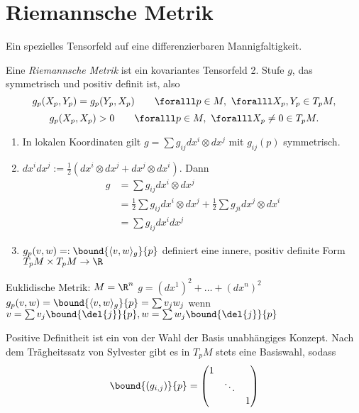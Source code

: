 \chapter{Riemannsche Metrik}

Ein spezielles Tensorfeld auf eine differenzierbaren Mannigfaltigkeit.

\begin{defn*}
	Eine \emph{Riemannsche Metrik} ist ein kovariantes Tensorfeld 2. Stufe $g$, das symmetrisch und positiv definit ist, also
	\[ g_p(X_p,Y_p) = g_p(Y_p,X_p) \qquad \foralll p \in M,\ \foralll X_p,Y_p \in T_pM, \]
	\[ g_p(X_p,X_p) > 0 \qquad \foralll p \in M,\ \foralll X_p \neq 0 \in T_pM. \]
\end{defn*}

\begin{rem*}
	\begin{enumerate}[label= {\roman*})]
		\item In lokalen Koordinaten gilt $ g = \sum g_{ij} dx^i \otimes dx^j $ mit $g_{ij}(p)$ symmetrisch.
		\item $ dx^idx^j := \frac{1}{2}(dx^i \otimes dx^j + dx^j \otimes dx^i) $. Dann
			\begin{align*}
				g &= \sum g_{ij} dx^i \otimes dx^j\\
				&= \frac{1}{2} \sum g_{ij} dx^i \otimes dx^j + \frac{1}{2} \sum g_{ji} dx^j \otimes dx^i\\
				&= \sum g_{ij} dx^idx^j
			\end{align*}
		\item $ g_p(v,w) =: \bound{\langle v,w\rangle_g}{p} $ definiert eine innere, positiv definite Form $ T_pM \times T_pM \to \R $
	\end{enumerate}
\end{rem*}

\begin{exmp*}
	Euklidische Metrik: $M = \R^n$
	$ g = (dx^1)^2 + \dots + (dx^n)^2 $
	$ g_p(v,w) = \bound{\langle v,w\rangle_g}{p} = \sum v_jw_j $ wenn $ v = \sum v_j \bound{\del{j}}{p}, w = \sum w_j \bound{\del{j}}{p}$
\end{exmp*}

\begin{rem}
	Positive Definitheit ist ein von der Wahl der Basis unabhängiges Konzept. Nach dem Trägheitssatz von Sylvester gibt es in $T_pM$ stets eine Basiswahl, sodass
	\[ \bound{(g_{i,j})}{p} = \begin{pmatrix}
		1 & &\\
		& \ddots &\\
		&&1
	\end{pmatrix} \]
\end{rem}

